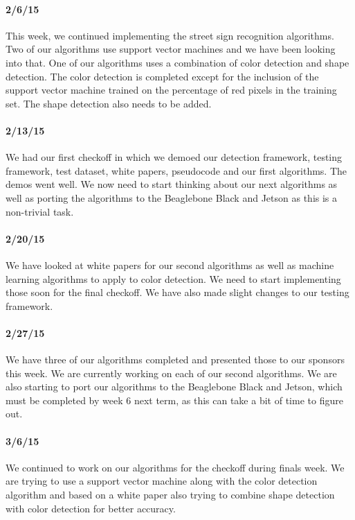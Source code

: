 \documentclass[letterpaper,10pt,titlepage]{article}
\begin{document}
    \paragraph*{2/6/15}
    This week, we continued implementing the street sign recognition 
    algorithms. Two of our algorithms use support vector machines and we have 
    been looking into that. One of our algorithms uses a combination of color
    detection and shape detection. The color detection is completed except for
    the inclusion of the support vector machine trained on the percentage of 
    red pixels in the training set. The shape detection also needs to be 
    added. 
    \paragraph*{2/13/15}
    We had our first checkoff in which we demoed our detection framework, 
    testing framework, test dataset, white papers, pseudocode and our first 
    algorithms. The demos went well. We now need to start thinking about our 
    next algorithms as well as porting the algorithms to the Beaglebone Black
    and Jetson as this is a non-trivial task.
    \paragraph*{2/20/15}
    We have looked at white papers for our second algorithms as well as 
    machine learning algorithms to apply to color detection. We need to start 
    implementing those soon for the final checkoff. We have also made slight 
    changes to our testing framework. 
    \paragraph*{2/27/15}
    We have three of our algorithms completed and presented those to our 
    sponsors this week. We are currently working on each of our second 
    algorithms. We are also starting to port our algorithms to the Beaglebone
    Black and Jetson, which must be completed by week 6 next term, as this can
    take a bit of time to figure out. 
    \paragraph*{3/6/15}
    We continued to work on our algorithms for the checkoff during finals week.
    We are trying to use a support vector machine along with the color 
    detection algorithm and based on a white paper also trying to combine shape
    detection with color detection for better accuracy. 
\end{document}
